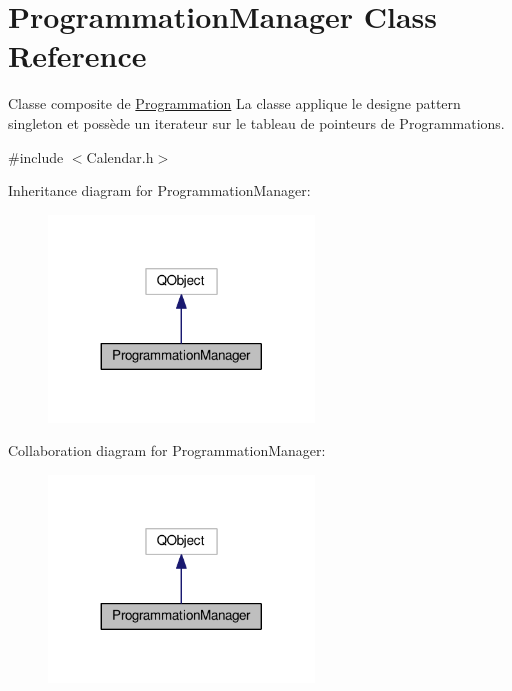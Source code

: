 \hypertarget{class_programmation_manager}{}\section{Programmation\+Manager Class Reference}
\label{class_programmation_manager}


Classe composite de \hyperlink{class_programmation}{Programmation} La classe applique le designe pattern singleton et possède un iterateur sur le tableau de pointeurs de Programmations.  




{\ttfamily \#include $<$Calendar.\+h$>$}



Inheritance diagram for Programmation\+Manager\+:\nopagebreak
\begin{figure}[H]
\begin{center}
\leavevmode
\includegraphics[width=200pt]{class_programmation_manager__inherit__graph}
\end{center}
\end{figure}


Collaboration diagram for Programmation\+Manager\+:\nopagebreak
\begin{figure}[H]
\begin{center}
\leavevmode
\includegraphics[width=200pt]{class_programmation_manager__coll__graph}
\end{center}
\end{figure}
